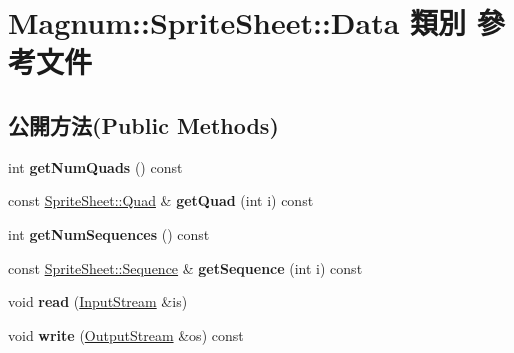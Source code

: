 \hypertarget{class_magnum_1_1_sprite_sheet_1_1_data}{}\section{Magnum\+:\+:Sprite\+Sheet\+:\+:Data 類別 參考文件}
\label{class_magnum_1_1_sprite_sheet_1_1_data}
\subsection*{公開方法(Public Methods)}
\begin{DoxyCompactItemize}
\item 
int {\bfseries get\+Num\+Quads} () const \hypertarget{class_magnum_1_1_sprite_sheet_1_1_data_adc36e46ec543e6a75fd56ef81d20806a}{}\label{class_magnum_1_1_sprite_sheet_1_1_data_adc36e46ec543e6a75fd56ef81d20806a}

\item 
const \hyperlink{class_magnum_1_1_sprite_sheet_1_1_quad}{Sprite\+Sheet\+::\+Quad} \& {\bfseries get\+Quad} (int i) const \hypertarget{class_magnum_1_1_sprite_sheet_1_1_data_a9abe07aa8f124568e4566800d365aad8}{}\label{class_magnum_1_1_sprite_sheet_1_1_data_a9abe07aa8f124568e4566800d365aad8}

\item 
int {\bfseries get\+Num\+Sequences} () const \hypertarget{class_magnum_1_1_sprite_sheet_1_1_data_ae72c4deae67aaee1ab8810628ed99afe}{}\label{class_magnum_1_1_sprite_sheet_1_1_data_ae72c4deae67aaee1ab8810628ed99afe}

\item 
const \hyperlink{class_magnum_1_1_sprite_sheet_1_1_sequence}{Sprite\+Sheet\+::\+Sequence} \& {\bfseries get\+Sequence} (int i) const \hypertarget{class_magnum_1_1_sprite_sheet_1_1_data_ae80bd0e727dbf0a51f9b0ac8d10e8390}{}\label{class_magnum_1_1_sprite_sheet_1_1_data_ae80bd0e727dbf0a51f9b0ac8d10e8390}

\item 
void {\bfseries read} (\hyperlink{class_magnum_1_1_input_stream}{Input\+Stream} \&is)\hypertarget{class_magnum_1_1_sprite_sheet_1_1_data_a7dde990f68f3631ff861718158621d1e}{}\label{class_magnum_1_1_sprite_sheet_1_1_data_a7dde990f68f3631ff861718158621d1e}

\item 
void {\bfseries write} (\hyperlink{class_magnum_1_1_output_stream}{Output\+Stream} \&os) const \hypertarget{class_magnum_1_1_sprite_sheet_1_1_data_ae444dcbf6ec05b229e0ff6d3524d8859}{}\label{class_magnum_1_1_sprite_sheet_1_1_data_ae444dcbf6ec05b229e0ff6d3524d8859}

\end{DoxyCompactItemize}
